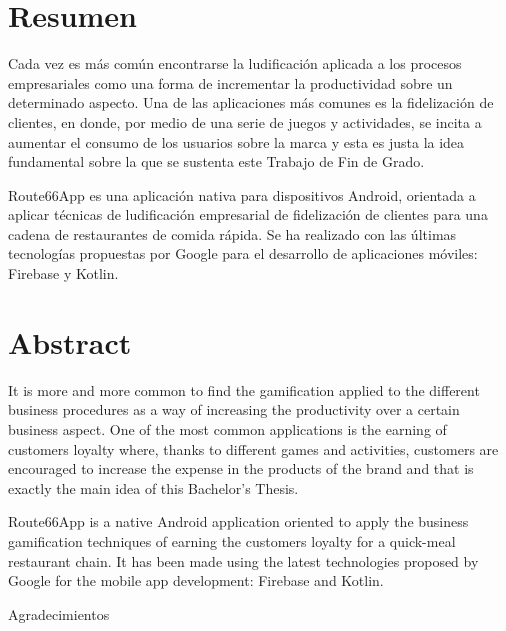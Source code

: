 \documentclass[twoside]{report}
\begin{document}
\newpage
\thispagestyle{empty}
\mbox{}

\clearpage


\section*{Resumen}

Cada vez es más común encontrarse la ludificación aplicada a los procesos empresariales como una forma de incrementar la productividad sobre un determinado aspecto. Una de las aplicaciones más comunes es la fidelización de clientes, en donde, por medio de una serie de juegos y actividades, se incita a aumentar el consumo de los usuarios sobre la marca y esta es justa la idea fundamental sobre la que se sustenta este Trabajo de Fin de Grado.

Route66App es una aplicación nativa para dispositivos Android, orientada a aplicar técnicas de ludificación empresarial de fidelización de clientes para una cadena de restaurantes de comida rápida. Se ha realizado con las últimas tecnologías propuestas por Google para el desarrollo de aplicaciones móviles: Firebase y Kotlin.


\section*{Abstract}


It is more and more common to find the gamification applied to the different business procedures as a way of increasing the productivity over a certain business aspect. One of the most common applications is the earning of customers loyalty where, thanks to different games and activities, customers are encouraged to increase the expense in the products of the brand and that is exactly the main idea of this Bachelor's Thesis.

Route66App is a native Android application oriented to apply the business gamification techniques of earning the customers loyalty for a quick-meal restaurant chain. It has been made using the latest technologies proposed by Google for the mobile app development: Firebase and Kotlin.

\clearpage


\hbox{}
\vspace{7cm}
\begin{huge}
Agradecimientos
\end{huge}
\end{document}

